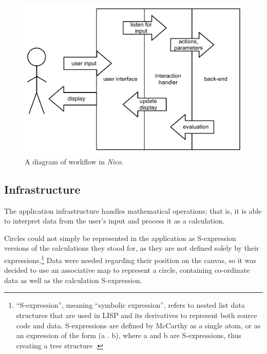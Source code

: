 \documentclass[12pt,twoside,notitlepage,xetex]{report}
\begin{document}
{\begin{center}
\begin{figure}[H]
\begin{center}
\includegraphics[width=\textwidth-2cm]{figs/nico_arch.pdf}
\end{center}
\caption{A diagram of workflow in \emph{Nico}.}
\label{fig:NicoFlow}
\end{figure}
\end{center}

\subsection{Infrastructure}

The application infrastructure handles mathematical operations; that is, it is able to interpret data from the user's input and process it as a calculation.

Circles could not simply be represented in the application as S-expression versions of the calculations they stood for, as they are not defined solely by their expressions.\footnote{``S-expression'', meaning ``symbolic expression'', refers to nested list data structures that are used in LISP and its derivatives to represent both source code and data.  S-expressions are defined by McCarthy as a single atom, or as an expression of the form {\ttfamily (a . b)}, where {\ttfamily a} and {\ttfamily b} are S-expressions, thus creating a tree structure \cite{McCarthy1960}.}  Data were needed regarding their position on the canvas, so it was decided to use an associative map to represent a circle, containing co-ordinate data as well as the calculation S-expression.

}
\end{document}
